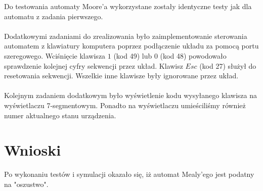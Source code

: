 \documentclass[wide,a4paper,titlepage,12pt] {article}
\begin{document}
Do testowania automaty Moore'a wykorzystane zostały identyczne testy jak dla automatu z zadania pierwszego.

\paragraph{}

Dodatkowymi zadaniami do zrealizowania było zaimplementowanie sterowania automatem z klawiatury komputera poprzez podłączenie układu za pomocą portu szeregowego. Wciśnięcie klawisza $1$ (kod 49) lub $0$ (kod 48) powodowało sprawdzenie kolejnej cyfry sekwencji przez układ. Klawisz $Esc$ (kod 27) służył do resetowania sekwencji. Wszelkie inne klawisze były ignorowane przez układ.

\paragraph{}

Kolejnym zadaniem dodatkowym było wyświetlenie kodu wysyłanego klawisza na wyświetlaczu 7-segmentowym. Ponadto na wyświetlaczu umieściliśmy również numer aktualnego stanu urządzenia.

  \newpage
  \section{Wnioski}
  Po wykonaniu testów i symulacji okazało się, iż automat Mealy'ego jest podatny na "oszustwo".
\end{document}
